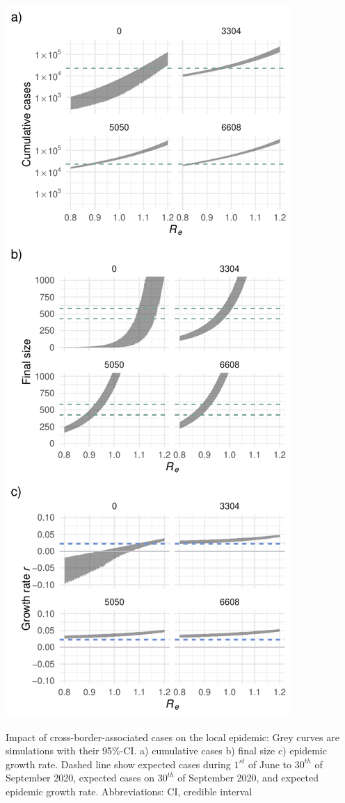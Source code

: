 \documentclass[10pt, a4paper, twoside]{article}
\begin{document}
\begin{suppfigure}[h]
\centering
\includegraphics[scale=0.6]{SF2_2021-04-20.pdf}
\caption{Impact of cross-border-associated cases on the local epidemic: Grey curves are simulations with their 95\%-CI. a) cumulative cases b) final size c) epidemic growth rate. Dashed line show expected cases during $1^{st}$ of June to $30^{th}$ of September 2020, expected cases on $30^{th}$ of September 2020, and expected epidemic growth rate. Abbreviations: CI, credible interval}
\label{sf2}
\end{suppfigure}
\end{document}
